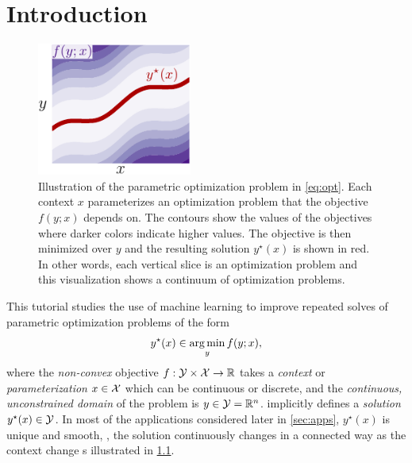 \chapter{Introduction}
\begin{figure}[t]
\centering
\includegraphics[width=2in]{fig/opt.pdf}
\caption{Illustration of the parametric optimization problem
  in \cref{eq:opt}.
  Each context $x$ parameterizes an
  optimization problem that the objective $f(y; x)$ depends on.
  The contours show the values of the objectives where
  darker colors indicate higher values.
  The objective is then minimized over $y$ and the resulting
  solution $y^\star(x)$ is shown in red.
  In other words, each vertical slice is an optimization problem
  and this visualization shows a continuum of optimization problems.
}
\label{fig:opt}
\end{figure}
This tutorial studies the use of machine learning
to improve repeated solves of parametric optimization
problems of the form
\begin{equation}
  y^\star(x) \in \operatorname*{arg\,min}_y f(y; x),
  \label{eq:opt}
\end{equation}
where the \emph{non-convex} objective
$f: {\mathcal{Y}}\times {\mathcal{X}}\rightarrow \mathbb{R}$
takes a \emph{context} or \emph{parameterization}
$x\in{\mathcal{X}}$ which can be continuous or discrete,
and the \emph{continuous, unconstrained domain} of
the problem is $y\in{\mathcal{Y}}=\mathbb{R}^n$.
 implicitly defines a \emph{solution}
$y^\star(x)\in{\mathcal{Y}}$.
In most of the applications considered later in
\cref{sec:apps}, $y^\star(x)$ is unique and smooth,
\ie, the solution continuously changes in a
connected way as the context change s illustrated
in \cref{fig:opt}.

